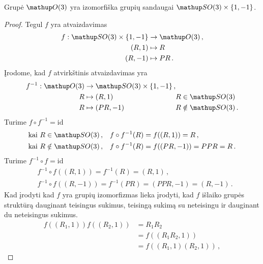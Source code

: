 \begin{proposition}
	Grupė $\Orth3$ yra izomorfiška grupių sandaugai
	$\SO3 \times \qty{1,-1}$.
\end{proposition}
\begin{proof}
	Tegul $f$ yra atvaizdavimas
	\begin{equation}
		\begin{aligned}
			f: \SO3 \times \qty{1,-1} &\to \Orth3\,,\\
			(R,1) &\mapsto R \\
			(R,-1) &\mapsto PR \,.
		\end{aligned}
	\end{equation}
	Įrodome, kad $f$ atvirkštinis atvaizdavimas yra
	\begin{equation}
		\begin{alignedat}{4}
			f^{-1}: \Orth3 &\to \SO3 \times \qty{1,-1}
			\,,\\
			R &\mapsto (R,1)  &R&\in \SO3 \\
			R &\mapsto (PR,-1)  &R&\notin\SO3
			\,.
		\end{alignedat}
	\end{equation}
	Turime $f \circ f^{-1} = \mathup{id}$
	\begin{equation}
		\begin{aligned}
			\text{kai } R \in\SO3 
			\,,\quad
			&f\circ f^{-1} (R) = f((R,1)) = R
			\,,\\
			\text{kai } R \notin\SO3 
			\,,\quad
			&f\circ f^{-1} (R) = f((PR,-1)) = PPR = R
			\,.
		\end{aligned}
	\end{equation}
	Turime $f^{-1} \circ f = \mathup{id}$
	\begin{equation}
		\begin{aligned}
			&f^{-1}\circ f ((R,1)) = f^{-1}(R) = (R,1)
			\,,\\
			&f^{-1}\circ f ((R,-1)) = f^{-1}(PR) = (PPR,-1)= (R,-1)
			\,.
		\end{aligned}
	\end{equation}
	Kad įrodyti kad $f$ yra grupių izomorfizmas lieka įrodyti,
	kad $f$ išlaiko grupės struktūrą dauginant teisingus sukimus,
	teisingą sukimą su neteisingu ir dauginant du neteisingus sukimus.
	\begin{equation}
		\begin{split}
			f((R_1,1))f((R_2,1))
			&= R_1 R_2 \\
			&= f((R_1 R_2,1)) \\
			&= f((R_1,1)(R_2,1)) \,,
		\end{split}

\end{equation}
\end{proof}
